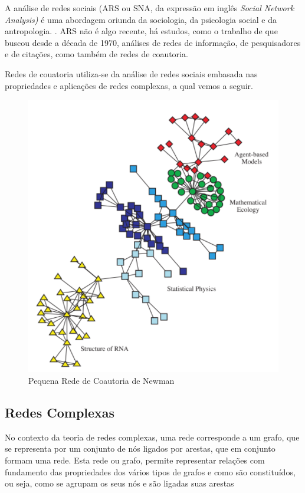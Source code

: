\documentclass[12pt]{article}
\begin{document}
A análise de redes sociais (ARS ou SNA, da expressão em inglês \textit{Social Network Analysis)} é uma abordagem oriunda da sociologia, da psicologia social e da antropologia. \cite{freeman1996some,wasserman1994social}. ARS não é algo recente, há estudos, como o trabalho de \cite{otte2002social} que buscou desde a década de 1970, análises de redes de informação, de pesquisadores e de citações, como também de redes de coautoria.

 Redes de couatoria utiliza-se da análise de redes sociais embasada nas propriedades e aplicações de redes complexas, a qual vemos a seguir.


\begin{figure}[H]
\centering
\includegraphics[scale=0.6]{images/rede-newman.pdf}
\caption{Pequena Rede de Coautoria de Newman}
\label{rede1}
\end{figure}


\subsection{Redes Complexas}

No contexto da teoria de redes complexas, uma rede corresponde a um grafo, que se representa por um conjunto de nós ligados por arestas, que em conjunto formam uma rede.  Esta rede ou grafo, permite representar relações com fundamento das propriedades dos vários tipos de grafos e como são constituídos, ou seja, como se agrupam os seus nós e são ligadas suas arestas %
\end{document}
